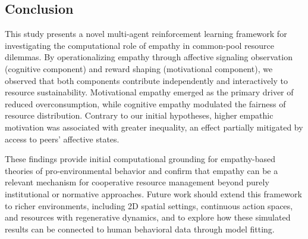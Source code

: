 \subsection{Conclusion}
This study presents a novel multi-agent reinforcement learning framework for investigating the computational role of empathy in common-pool resource dilemmas. By operationalizing empathy through affective signaling observation (cognitive component) and reward shaping (motivational component), we observed that both components contribute independently and interactively to resource sustainability. Motivational empathy emerged as the primary driver of reduced overconsumption, while cognitive empathy modulated the fairness of resource distribution. Contrary to our initial hypotheses, higher empathic motivation was associated with greater inequality, an effect partially mitigated by access to peers' affective states.

These findings provide initial computational grounding for empathy-based theories of pro-environmental behavior and confirm that empathy can be a relevant mechanism for cooperative resource management beyond purely institutional or normative approaches. Future work should extend this framework to richer environments, including 2D spatial settings, continuous action spaces, and resources with regenerative dynamics, and to explore how these simulated results can be connected to human behavioral data through model fitting.
